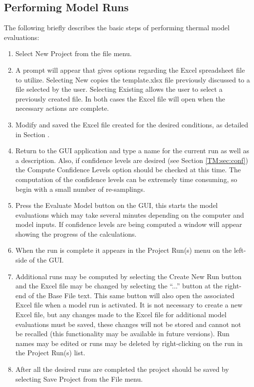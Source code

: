 \subsection{Performing Model Runs}
The following briefly describes the basic steps of performing thermal model evaluations:
\begin{enumerate}
\item Select New Project from the file menu.
\item A prompt will appear that gives options regarding the Excel spreadsheet file to utilize.  Selecting New copies the template.xlsx file previously discussed to a file selected by the user.  Selecting Existing allows the user to select a previously created file.  In both cases the Excel file will open when the necessary actions are complete.
\item Modify and saved the Excel file created for the desired conditions, as detailed in Section .
\item Return to the GUI application and type a name for the current run as well as a description. Also, if confidence levels are desired (see Section \ref{TM:sec:conf}) the Compute Confidence Levels option should be checked at this time.  The computation of the confidence levels can be extremely time consuming, so begin with a small number of re-samplings.
\item Press the Evaluate Model button on the GUI, this starts the model evaluations which may take several minutes depending on the computer and model inputs.  If confidence levels are being computed a window will appear showing the progress of the calculations.
\item When the run is complete it appears in the Project Run(s) menu on the left-side of the GUI.
\item Additional runs may be computed by selecting the Create New Run button and the Excel file may be changed by selecting the ``...'' button at the right-end of the Base File text. This same button will also open the associated Excel file when a model run is activated.  It is not necessary to create a new Excel file, but any changes made to the Excel file for additional model evaluations must be saved, these changes will not be stored and cannot not be recalled (this functionality may be available in future versions). Run names may be edited or runs may be deleted by right-clicking on the run in the Project Run(s) list.
\item After all the desired runs are completed the project should be saved by selecting Save Project from the File menu.
\end{enumerate}

